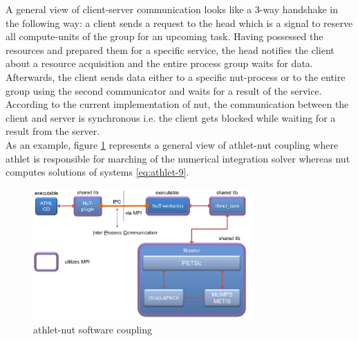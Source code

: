 A general view of client-server communication looks like a 3-way handshake in the following way: a client sends a request to the head which is a signal to reserve all compute-units of the group for an upcoming task. Having possessed the resources and prepared them for a specific service, the head notifies the client about a resource acquisition and the entire process group waits for data. Afterwards, the client sends data either to a specific \acrshort{nut}-process or to the entire group using the second communicator and waits for a result of the service. According to the current implementation of \acrshort{nut}, the communication between the client and server is synchronous i.e. the client gets blocked while waiting for a result from the server. \\


As an example, figure \ref{fig:introduction-athlet-nut-coupling} represents a general view of \acrshort{athlet}-\acrshort{nut} coupling where \acrshort{athlet} is responsible for marching of the numerical integration solver whereas \acrshort{nut} computes solutions of systems \ref{eq:athlet-9}.\\


\figpointer{\ref{fig:introduction-athlet-nut-coupling}}
\begin{figure}
  \centering
  \includegraphics[width=0.75\textwidth]{figures/introduction-athlet-nut-coupling.png}
    \caption{\acrshort{athlet}-\acrshort{nut} software coupling}
\label{fig:introduction-athlet-nut-coupling}
\end{figure}


